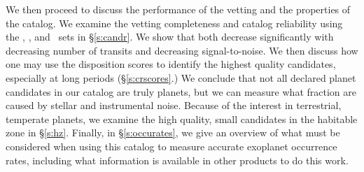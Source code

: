 We then proceed to discuss the performance of the vetting and the properties of the catalog. We examine the vetting completeness and catalog reliability using the \injtce, \invtce, and \scrtce\ sets in \S\ref{s:candr}. We show that both decrease significantly with decreasing number of transits and decreasing signal-to-noise.  We then discuss how one may use the disposition scores to identify the highest quality candidates, especially at long periods (\S\ref{s:crscores}.)  We conclude that not all declared planet candidates in our catalog are truly planets, but we can measure what fraction are caused by stellar and instrumental noise. Because of the interest in terrestrial, temperate planets, we examine the high quality, small candidates in the habitable zone in \S\ref{s:hz}. Finally, in \S\ref{s:occurates}, we give an overview of what must be considered when using this catalog to measure accurate exoplanet occurrence rates, including what information is available in other \Kepler{} products to do this work.



